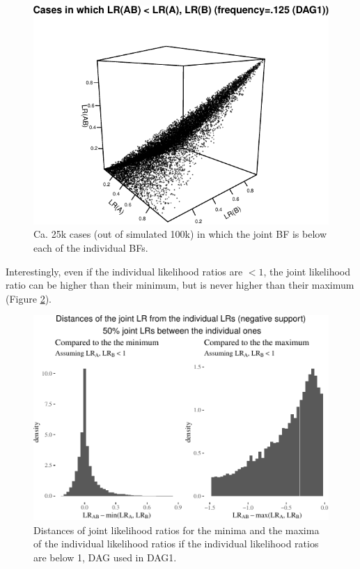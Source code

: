 \documentclass[
  10pt,
  dvipsnames,enabledeprecatedfontcommands]{scrartcl}
\begin{document}
\begin{figure}

\begin{center}\includegraphics[width=1\linewidth]{conjunction-appendix5_files/figure-latex/unnamed-chunk-10-1} \end{center}
\caption{Ca. 25k cases (out of simulated 100k) in which the joint BF is below each of the individual BFs.}
\label{fig:LRfails}
\end{figure}

Interestingly, even if the individual likelihood ratios are \(<1\), the
joint likelihood ratio can be higher than their minimum, but is never
higher than their maximum (Figure \ref{fig:LRlowerPlot}).

\vspace{1mm}
\footnotesize

\normalsize

\begin{figure}


\begin{center}\includegraphics[width=1\linewidth]{conjunction-appendix5_files/figure-latex/unnamed-chunk-12-1} \end{center}

\caption{Distances of joint likelihood ratios for the minima and the maxima of the individual likelihood ratios if the individual likelihood ratios are below 1, DAG used in \textsf{DAG1}.} 
\label{fig:LRlowerPlot}
\end{figure}
\end{document}
